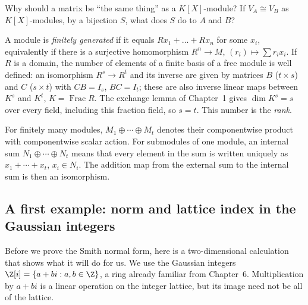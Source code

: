 \begin{think}
Why should a matrix be ``the same thing'' as a $K[X]$-module? If $V_A\cong V_B$ as $K[X]$-modules, by a bijection $S$, what does $S$ do to $A$ and $B$?
\end{think}

A module is \emph{finitely generated} if it equals $Rx_1+\dots+Rx_n$ for some $x_i$, equivalently if there is a surjective homomorphism $R^n\to M$, $(r_i)\mapsto\sum r_ix_i$. If $R$ is a domain, the number of elements of a finite basis of a free module is well defined: an isomorphism $R^s\to R^t$ and its inverse are given by matrices $B$ ($t\times s$) and $C$ ($s\times t$) with $CB=I_s$, $BC=I_t$; these are also inverse linear maps between $K^s$ and $K^t$, $K=\operatorname{Frac}R$. The exchange lemma of Chapter~1 gives $\dim K^s=s$ over every field, including this fraction field, so $s=t$. This number is the \emph{rank}.

For finitely many modules, $M_1\oplus\cdots\oplus M_t$ denotes their
componentwise product with componentwise scalar action. For submodules of one
module, an internal sum $N_1\oplus\cdots\oplus N_t$ means that every
element in the sum is written uniquely as $x_1+\cdots+x_t$, $x_i\in N_i$.
The addition map from the external sum to the internal sum is then an isomorphism.

\subsection*{A first example: norm and lattice index in the Gaussian integers}

Before we prove the Smith normal form, here is a two-dimensional calculation
that shows what it will do for us. We use the Gaussian integers
$\Z[i]=\{a+bi:a,b\in\Z\}$, a ring already familiar from Chapter~6.
Multiplication by $a+bi$ is a linear operation on the integer lattice,
but its image need not be all of the lattice.

